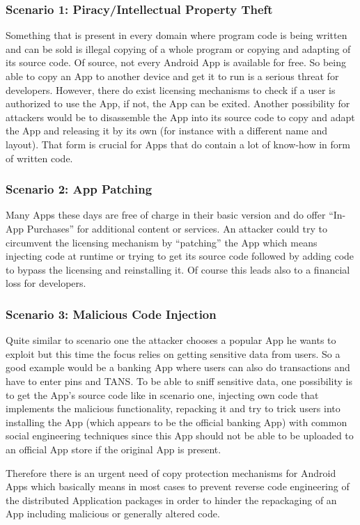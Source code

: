 \subsubsection*{Scenario 1: Piracy/Intellectual Property Theft}\label{section:scenario_1}
Something that is present in every domain where program code is being written
and can be sold is illegal copying of a whole program or copying and adapting of
its source code. Of source, not every Android App is available for free. So being
able to copy an App to another device and get it to run is a serious threat for developers. However, there do exist licensing mechanisms to check if a user is 
authorized to use the App, if not, the App can be exited.
Another possibility for attackers would be to disassemble
the App into its source code to copy and adapt the App and releasing it by its own
(for instance with a different name and layout).
That form is crucial for Apps that do contain a lot of know-how in form of written code.


\subsubsection*{Scenario 2: App Patching}\label{section:scenario_2}
Many Apps these days are free of charge in their basic version and
do offer ``In-App Purchases'' for additional content or services.
An attacker could try to circumvent the licensing mechanism 
by ``patching'' the App which means injecting code at runtime or trying to get its source
code followed by adding code to bypass the licensing and reinstalling it. Of course this
leads also to a financial loss for developers. 

\subsubsection*{Scenario 3: Malicious Code Injection}\label{section:scenario_3}
Quite similar to scenario one the attacker chooses a popular App he wants to exploit 
but this time the focus relies on getting sensitive data from users. So a good example
would be a banking App where users can also do transactions and have to enter pins and TANS. To be able to sniff sensitive data, one possibility is to get the App's source code
like in scenario one, injecting own code that implements the malicious functionality, repacking it and try to trick users into installing the App (which appears to be the
official banking App) with common social engineering techniques since this App should not be able to be uploaded to an official App store if the original App is present. 



Therefore there is an urgent need of copy protection mechanisms
for Android Apps which basically means in most cases to prevent reverse code engineering of the distributed Application packages in order to hinder the repackaging of an App including malicious or generally altered code. 
